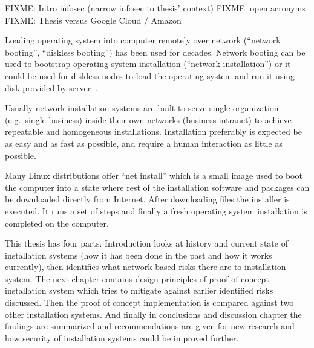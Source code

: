 
\iffalse
FIXME: TODO REMOVE THIS LIST
\begin{itemize}
\item INTRODUCTION: The Setting - bird eye's view - the challenge to be tackled / thing to be be improved in general
\item INTRODUCTION: Past research done
\item INTRODUCTION: Gap in knowledge/problem not yet solved
\item INTRODUCTION: Purpose and method of this work
\item INTRODUCTION: More detailed description what was done
\item INTRODUCTION: Results acquired
\item INTRODUCTION: Analysis and limitations of the result (Mostly relocate to Conclusions)
\item INTRODUCTION: Value (Mostly relocate to Conclusions)
\end{itemize}
\fi

FIXME: Intro infosec (narrow infosec to thesis' context)
FIXME: open acronyms
FIXME: Thesis versus Google Cloud / Amazon

Loading operating system into computer remotely over network
(``network booting'', ``diskless booting'') has been used for
decades. Network booting can be used to bootstrap operating system
installation (``network installation'') or it could be used for
diskless nodes to load the operating system and run it using disk
provided by server~\cite{anvin2008x86}.

Usually network installation systems are built to serve single
organization (e.g.\ single business) inside their own networks
(business intranet) to achieve repeatable and homogeneous
installations. Installation preferably is expected be as easy and as
fast as possible, and require a human interaction as little as
possible.

Many Linux distributions offer ``net install'' which is a small image
used to boot the computer into a state where rest of the installation
software and packages can be downloaded directly from Internet. After
downloading files the installer is executed. It runs a set of steps
and finally a fresh operating system installation is completed on the
computer.

This thesis has four parts. Introduction looks at history and current
state of installation systems (how it has been done in the past and
how it works currently), then identifies what network based risks
there are to installation system. The next chapter contains design
principles of proof of concept installation system which tries to
mitigate against earlier identified risks discussed. Then the proof of
concept implementation is compared against two other installation
systems. And finally in conclusions and discussion chapter the
findings are summarized and recommendations are given for new research
and how security of installation systems could be improved further.

